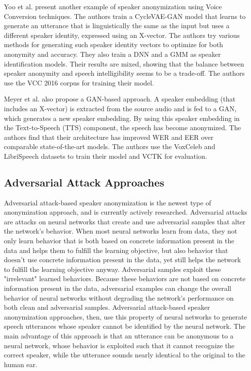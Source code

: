 \documentclass{Interspeech2024}
\begin{document}
Yoo et al. \cite{yoo_2020_voice_conversion} present another example of speaker anonymization using Voice Conversion techniques. 
The authors train a CycleVAE-GAN model that learns to generate an utterance that is linguistically the same as the input but uses a different speaker identity, expressed using an X-vector. 
The authors try various methods for generating such speaker identity vectors to optimize for both anonymity and accuracy. 
They also train a DNN and a GMM as speaker identification models. 
Their results are mixed, showing that the balance between speaker anonymity and speech intelligibility seems to be a trade-off.
The authors use the VCC 2016 corpus for training their model.

Meyer et al. \cite{meyer_2023_adversarial_gan} also propose a GAN-based approach. 
A speaker embedding (that includes an X-vector) is extracted from the source audio and is fed to a GAN, which generates a new speaker embedding. 
By using this speaker embedding in the Text-to-Speech (TTS) component, the speech has become anonymized. 
The authors find that their architecture has improved WER and EER over comparable state-of-the-art models.
The authors use the VoxCeleb and LibriSpeech datasets to train their model and VCTK for evaluation.

\subsection{Adversarial Attack Approaches}
Adversarial attack-based speaker anonymization is the newest type of anonymization approach, and is currently actively researched.
Adversarial attacks are attacks on neural networks that create and use adversarial samples that alter the network's behavior.
When most neural networks learn from data, they not only learn behavior that is both based on concrete information present in the data and helps them to fulfill the learning objective, but also behavior that doesn't use concrete information present in the data, yet still helps the network to fulfill the learning objective anyway.
Adversarial samples exploit these "irrelevant" learned behaviors.
Because these behaviors are not based on concrete information present in the data, adversarial examples can change the overall behavior of neural networks without degrading the network's performance on both clean and adversarial samples.
Adversarial attack-based speaker anonymization approaches, then, use this property of neural networks to generate speech utterances whose speaker cannot be identified by the neural network.
The main advantage of this approach is that an utterance can be anonymous to a neural network, whose behavior is exploited such that it cannot recognize the correct speaker, while the utterance sounds nearly identical to the original to the human ear.
\end{document}
